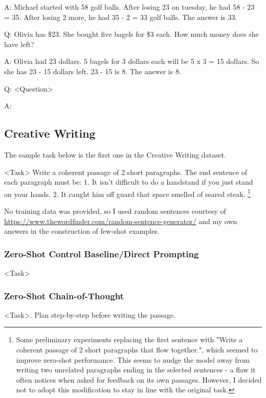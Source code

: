 \documentclass[11pt]{article}
\begin{document}
A: Michael started with 58 golf balls. After losing 23 on tuesday, he had 58 - 23 = 35. After losing 2 more, he had 35 - 2 = 33 golf balls. The answer is 33.

Q: Olivia has \$23. She bought five bagels for \$3 each. How much money does she have left?

A: Olivia had 23 dollars. 5 bagels for 3 dollars each will be 5 x 3 = 15 dollars. So she has 23 - 15 dollars left. 23 - 15 is 8. The answer is 8.

Q: <Question>

A:

\subsection{Creative Writing}

The sample task below is the first one in the Creative Writing dataset. \cite{yao_tree_2023}

<Task> Write a coherent passage of 2 short paragraphs. The end sentence of each paragraph must be: 1. It isn't difficult to do a handstand if you just stand on your hands. 2. It caught him off guard that space smelled of seared steak. \footnote{Some preliminary experiments replacing the first sentence with "Write a coherent passage of 2 short paragraphs that flow together.", which seemed to improve zero-shot performance. This seems to nudge the model away from writing two unrelated paragraphs ending in the selected sentences - a flaw it often notices when asked for feedback on its own passages. However, I decided not to adopt this modification to stay in line with the original task.}

No training data was provided, so I used random sentences courtesy of \url{https://www.thewordfinder.com/random-sentence-generator/} and my own answers in the construction of few-shot examples.

\subsubsection*{Zero-Shot Control Baseline/Direct Prompting}

<Task>

\subsubsection*{Zero-Shot Chain-of-Thought}

<Task>. Plan step-by-step before writing the passage.
\end{document}
